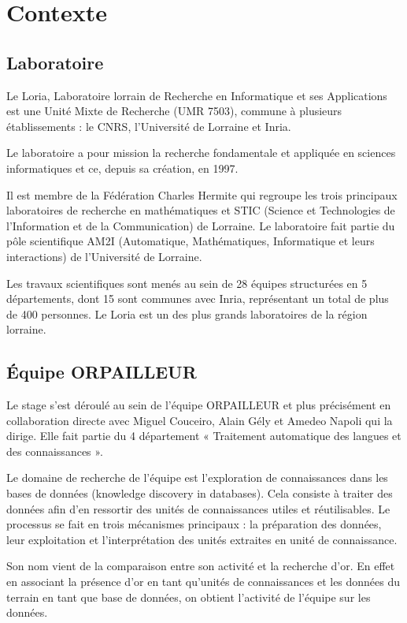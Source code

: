 \chapter{Contexte}

\section{Laboratoire}

Le Loria, Laboratoire lorrain de Recherche en Informatique et ses Applications est une Unité Mixte de Recherche (UMR 7503), commune à plusieurs établissements : le CNRS, l’Université de Lorraine et Inria.

\bigbreak

Le laboratoire a pour mission la recherche fondamentale et appliquée en sciences informatiques et ce, depuis sa création, en 1997.

\bigbreak

Il est membre de la Fédération Charles Hermite qui regroupe les trois principaux  laboratoires de recherche en mathématiques et STIC (Science et Technologies de l’Information et de la Communication) de Lorraine. Le laboratoire fait partie du pôle scientifique AM2I (Automatique, Mathématiques, Informatique et leurs interactions) de l’Université de Lorraine.

\bigbreak

Les travaux scientifiques sont menés au sein de 28 équipes structurées en 5 départements, dont 15 sont communes avec Inria, représentant un total de plus de 400 personnes. Le Loria est un des plus grands laboratoires de la région lorraine.

\section{Équipe ORPAILLEUR}

Le stage s'est déroulé au sein de l'équipe ORPAILLEUR et plus précisément en collaboration directe avec Miguel Couceiro, Alain Gély et Amedeo Napoli qui la dirige. Elle fait partie du 4 département « Traitement automatique des langues et des connaissances ». 

\bigbreak

Le domaine de recherche de l'équipe est l'exploration de connaissances dans les bases de données (knowledge discovery in databases). Cela consiste à traiter des données afin d'en ressortir des unités de connaissances utiles et réutilisables. Le processus se fait en trois mécanismes principaux : la préparation des données, leur exploitation et l'interprétation des unités extraites en unité de connaissance.

\bigbreak

Son nom vient de la comparaison entre son activité et la recherche d'or. En effet en associant la présence d'or en tant qu'unités de connaissances et les données du terrain en tant que base de données, on obtient l'activité de l'équipe sur les données.